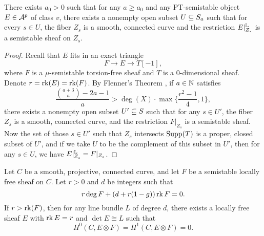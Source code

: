 \begin{lem}\label{flenner}
    There exists $a_0 > 0$ such that for any $a \ge a_0$ and any PT-semistable object $E \in \mathcal{A}^p$ of class $v$, there exists a nonempty open subset $U \subseteq S_a$ such that for every $s \in U$, the fiber $Z_s$ is a smooth, connected curve and the restriction $E|^{\mathbb{L}}_{Z_s}$ is a semistable sheaf on $Z_s$.
\end{lem}
\begin{proof}
    Recall that $E$ fits in an exact triangle
    \[ F \to E \to T[-1], \]
    where $F$ is a $\mu$-semistable torsion-free sheaf and $T$ is a 0-dimensional sheaf. Denote $r = \operatorname{\mathrm{rk}}(E) = \operatorname{\mathrm{rk}}(F)$. By Flenner's Theorem \cite[Theorem 7.1.1]{HL}, if $a \in \mathbb{N}$ satisfies
    \[ \frac{\binom{a+3}{a} - 2a - 1}{a} > \deg(X)\cdot \max\{\frac{r^2 - 1}{4}, 1\}, \]
    there exists a nonempty open subset $U' \subseteq S$ such that for any $s \in U'$, the fiber $Z_s$ is a smooth, connected curve, and the restriction $F|_{Z_s}$ is a semistable sheaf. Now the set of those $s \in U'$ such that $Z_s$ intersects $\operatorname{\mathrm{Supp}}(T)$ is a proper, closed subset of $U'$, and if we take $U$ to be the complement of this subset in $U'$, then for any $s \in U$, we have $E|^{\mathbb{L}}_{Z_s} = F|_{Z_s}$.
\end{proof}

\begin{lem}\label{seshadrimainlemma1}
    Let $C$ be a smooth, projective, connected curve, and let $F$ be a semistable locally free sheaf on $C$. Let $r > 0$ and $d$ be integers such that
    \[ r \deg F + (d + r(1-g)) \operatorname{\mathrm{rk}} F = 0. \]
    If $r > \operatorname{\mathrm{rk}}(F)$, then for any line bundle $L$ of degree $d$, there exists a locally free sheaf $E$ with $\operatorname{\mathrm{rk}} E = r$ and $\det E \cong L$ such that
    \[ H^0(C, E \otimes F) = H^1(C, E \otimes F) = 0. \]
\end{lem}

